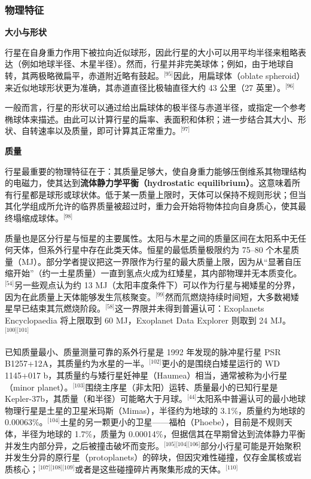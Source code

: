 \subsubsection{物理特征}
\textbf{大小与形状}

行星在自身重力作用下被拉向近似球形，因此行星的大小可以用平均半径来粗略表达（例如地球半径、木星半径）。然而，行星并非完美球体；例如，由于地球自转，其两极略微扁平，赤道附近略有鼓起。\(^\text{[95]}\)因此，用扁球体（oblate spheroid）来近似地球形状更为准确，其赤道直径比极轴直径大约 43 公里（27 英里）。\(^\text{[96]}\)

一般而言，行星的形状可以通过给出扁球体的极半径与赤道半径，或指定一个参考椭球体来描述。由此可以计算行星的扁率、表面积和体积；进一步结合其大小、形状、自转速率以及质量，即可计算其正常重力。\(^\text{[97]}\)

\textbf{质量}

行星最重要的物理特征在于：其质量足够大，使自身重力能够压倒维系其物理结构的电磁力，使其达到\textbf{流体静力学平衡（hydrostatic equilibrium）}。这意味着所有行星都是球形或球状体。低于某一质量上限时，天体可以保持不规则形状；但当其化学组成所允许的临界质量被超过时，重力会开始将物体拉向自身质心，使其最终塌缩成球体。\(^\text{[98]}\)

质量也是区分行星与恒星的主要属性。太阳与木星之间的质量区间在太阳系中无任何天体，但系外行星中存在此类天体。恒星的最低质量极限约为 75–80 个木星质量（MJ）。部分学者提议把这一界限作为行星的最大质量上限，因为从“显著自压缩开始”（约一土星质量）一直到氢点火成为红矮星，其内部物理并无本质变化。\(^\text{[54]}\)另一些观点认为约 13 MJ（太阳丰度条件下）可以作为行星与褐矮星的分界，因为在此质量上天体能够发生氘核聚变。\(^\text{[99]}\)然而氘燃烧持续时间短，大多数褐矮星早已结束其氘燃烧阶段。\(^\text{[58]}\)这一界限并未得到普遍认可：Exoplanets Encyclopaedia 将上限取到 60 MJ，Exoplanet Data Explorer 则取到 24 MJ。\(^\text{[100][101]}\)

已知质量最小、质量测量可靠的系外行星是 1992 年发现的脉冲星行星 PSR B1257+12A，其质量约为水星的一半。\(^\text{[102]}\)更小的是围绕白矮星运行的 WD 1145+017 b，其质量约与矮行星妊神星（Haumea）相当，通常被称为小行星（minor planet）。\(^\text{[103]}\)围绕主序星（非太阳）运转、质量最小的已知行星是 Kepler-37b，其质量（和半径）可能略大于月球。\(^\text{[44]}\)太阳系中普遍认可的最小地球物理行星是土星的卫星米玛斯（Mimas），半径约为地球的 3.1\%，质量约为地球的 0.00063\%。\(^\text{[104]}\)土星的另一颗更小的卫星——福柏（Phoebe），目前是不规则天体，半径为地球的 1.7\%，质量为 0.00014\%，但据信其在早期曾达到流体静力平衡并发生内部分异，之后被撞击破坏而变形。\(^\text{[105][104][106]}\)部分小行星可能是开始聚积并发生分异的原行星（protoplanets）的碎块，但因灾难性碰撞，仅存金属核或岩质核心；\(^\text{[107][108][109]}\)或者是这些碰撞碎片再聚集形成的天体。\(^\text{[110]}\)

